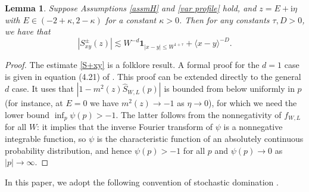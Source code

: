 \documentclass{article}
\newcommand{\1}{\mathds{1}}
\numberwithin{equation}{section}
\newcommand{\be}{\begin{equation}}
\newcommand{\ee}{\end{equation}}
\newcommand{\e}{{\varepsilon}}
\newcommand{\wh}{\widehat}
\newcommand{\ii}{\mathrm{i}} %
\renewcommand{\leq}{\leqslant}
\renewcommand{\geq}{\geqslant}
\renewcommand{\le}{\leq}
\renewcommand{\ge}{\geq}
\DeclareMathOperator{\OO}{O}
\theoremstyle{plain} %
\newtheorem{lemma}[theorem]{Lemma}
\theoremstyle{remark}
\begin{document}
\begin{lemma} \label{lem deter}
Suppose Assumptions \ref{assmH} and \ref{var profile} hold, and $z=E+\ii \eta$ with $E\in (-2+\kappa,2-\kappa)$ for a constant $\kappa>0$. 
Then for any constants $\tau, D>0$, we have that
\be\label{S+xy}|S^\pm_{xy}(z)| \lesssim    W^{-d}\mathbf 1_{|x-y|\le W^{1+\tau}} +  \langle x-y\rangle^{-D} . \ee %
\end{lemma}
\begin{proof}
The estimate \eqref{S+xy} is a folklore result. A formal proof for the $d=1$ case is given in equation (4.21) of \cite{PartII}. This proof can be extended directly to the general $d$ case. It uses that $|1-m^2(z)\wh S_{W,L}(p)|$ is bounded from below uniformly in $p$ (for instance, at $E=0$ we have $m^2(z)\to -1$ as $\eta\to 0$), for which we need the lower bound $\inf_{p}\psi(p)>-1$. The latter follows from the nonnegativity of $f_{W,L}$ for all $W$: it implies that the inverse Fourier transform of $\psi$ is a nonnegative integrable function, so $\psi$ is the characteristic function of an absolutely continuous probability distribution, and hence $\psi(p)>-1$ for all $p$ and $\psi(p)\to 0$ as $|p|\to\infty$.
\end{proof}


In this paper, we adopt the following convention of stochastic domination \cite{EKY_Average}. 
\end{document}
